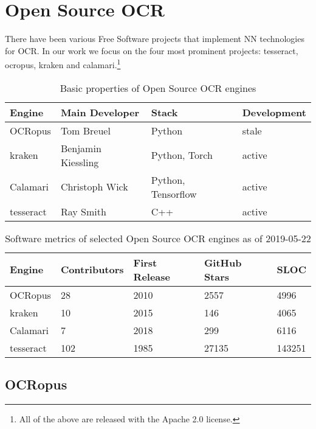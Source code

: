 \documentclass[conference]{IEEEtran}
\begin{document}
\section*{Open Source OCR}

There have been various Free Software projects that implement NN technologies
for OCR. In our work we focus on the four most prominent projects: tesseract, ocropus,
kraken and calamari.\footnote{All of the above are released with the Apache 2.0 license.}

\begin{table}[b]
\begin{tabular}{llll}
\hline
Engine    & Main Developer     & Stack                      & Development \\ \hline
OCRopus   & Tom Breuel         & Python                     & stale       \\
kraken    & Benjamin Kiessling & Python, Torch              & active      \\
Calamari  & Christoph Wick     & Python, Tensorflow         & active      \\
tesseract & Ray Smith          & C++                        & active
\end{tabular}
\caption{Basic properties of Open Source OCR engines}
\label{tab:basic}
\end{table}

\begin{table}[b]
\begin{tabular}{lllll}
\hline
Engine    & Contributors & First Release & GitHub Stars & SLOC \\ \hline
OCRopus   & 28           & 2010          & 2557         & 4996 \\
kraken    & 10           & 2015          & 146          & 4065 \\
Calamari  & 7            & 2018          & 299          & 6116 \\
tesseract & 102          & 1985          & 27135        & 143251 \\

\end{tabular}
\caption{Software metrics of selected Open Source OCR engines as of 2019-05-22}
\label{tab:stats}
\end{table}

\subsection*{OCRopus}
\end{document}
